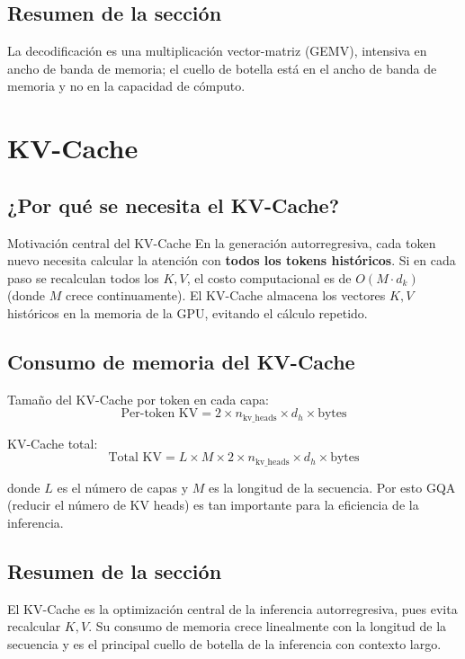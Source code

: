 \documentclass[a4paper]{article}
\begin{document}
\subsection{Resumen de la sección}

La decodificación es una multiplicación vector-matriz (GEMV), intensiva en ancho de banda de memoria; el cuello de botella está en el ancho de banda de memoria y no en la capacidad de cómputo.

\section{KV-Cache}

\subsection{¿Por qué se necesita el KV-Cache?}

\begin{importantbox}{Motivación central del KV-Cache}
En la generación autorregresiva, cada token nuevo necesita calcular la atención con \textbf{todos los tokens históricos}. Si en cada paso se recalculan todos los $K, V$, el costo computacional es de $O(M \cdot d_k)$ (donde $M$ crece continuamente). El KV-Cache almacena los vectores $K, V$ históricos en la memoria de la GPU, evitando el cálculo repetido.
\end{importantbox}

\subsection{Consumo de memoria del KV-Cache}

Tamaño del KV-Cache por token en cada capa:
$$
\text{Per-token KV} = 2 \times n_{\text{kv\_heads}} \times d_h \times \text{bytes}
$$

KV-Cache total:
$$
\text{Total KV} = L \times M \times 2 \times n_{\text{kv\_heads}} \times d_h \times \text{bytes}
$$

donde $L$ es el número de capas y $M$ es la longitud de la secuencia. Por esto GQA (reducir el número de KV heads) es tan importante para la eficiencia de la inferencia.

\subsection{Resumen de la sección}

El KV-Cache es la optimización central de la inferencia autorregresiva, pues evita recalcular $K, V$. Su consumo de memoria crece linealmente con la longitud de la secuencia y es el principal cuello de botella de la inferencia con contexto largo.
\end{document}
